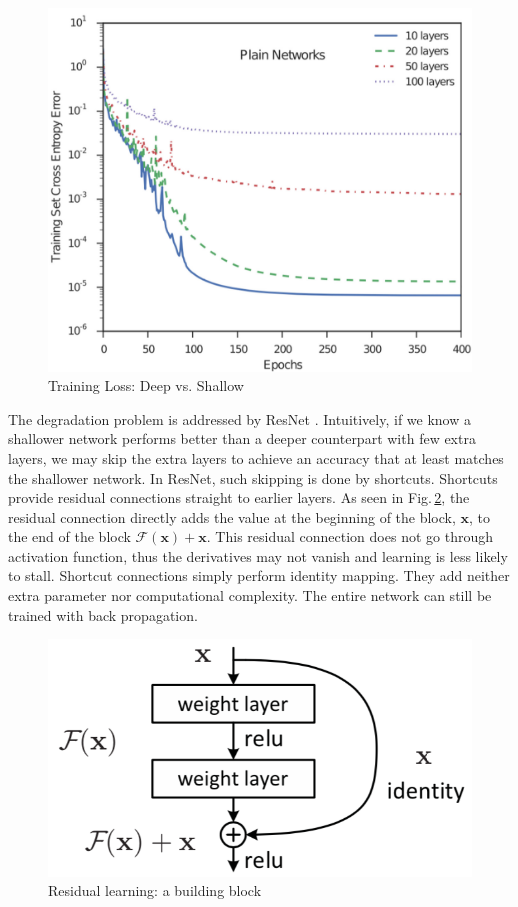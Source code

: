 \begin{figure}[h]
	\centering
	\includegraphics[scale=0.5]{Figs/deeploss.jpg}
    \caption{Training Loss: Deep vs. Shallow \cite{Srivastava2015}}
    \label{deeploss}
\end{figure}

The degradation problem is addressed by ResNet  \citep{resnet}. Intuitively, if we know a shallower network performs better than a deeper counterpart with few extra layers, we may skip the extra layers to achieve an accuracy that at least matches the shallower network. In ResNet, such skipping is done by shortcuts. Shortcuts provide residual connections straight to earlier layers. As seen in Fig.\,\ref{residualblock}, the residual connection directly adds the value at the beginning of the block, $\mathbf{x}$, to the end of the block $\mathcal{F}(\mathbf{x})+\mathbf{x}$. This residual connection does not go through activation function, thus the derivatives may not vanish and learning is less likely to stall. Shortcut connections simply perform identity mapping. They add neither extra parameter nor computational complexity. The entire network can still be trained with back propagation.

\begin{figure}[h]
	\centering
	\includegraphics[scale=0.5]{Figs/residualblock.png}
    \caption{Residual learning: a building block \cite{resnet}}
    \label{residualblock}
\end{figure}


